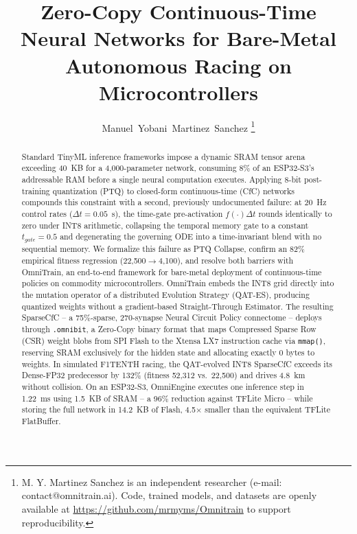 \documentclass[10pt,journal]{IEEEtran}
\begin{document}
\setlength{\textfloatsep}{4pt plus 1.0pt minus 2.0pt}
\setlength{\floatsep}{4pt plus 1.0pt minus 2.0pt}
\setlength{\intextsep}{4pt plus 1.0pt minus 2.0pt}
\setlength{\abovedisplayskip}{3pt}
\setlength{\belowdisplayskip}{3pt}

\title{Zero-Copy Continuous-Time Neural Networks for Bare-Metal Autonomous Racing on Microcontrollers}

\author{Manuel~Yobani~Martinez~Sanchez
\thanks{M. Y. Martinez Sanchez is an independent researcher (e-mail: contact@omnitrain.ai). Code, trained models, and datasets are openly available at \url{https://github.com/mrmyms/Omnitrain} to support reproducibility.}}


\maketitle

\begin{abstract}
Standard TinyML inference frameworks impose a dynamic SRAM tensor arena exceeding 40~KB for a 4,000-parameter network, consuming 8\% of an ESP32-S3's addressable RAM before a single neural computation executes. Applying 8-bit post-training quantization (PTQ) to closed-form continuous-time (CfC) networks compounds this constraint with a second, previously undocumented failure: at 20~Hz control rates ($\Delta t = 0.05$~s), the time-gate pre-activation $f(\cdot)\Delta t$ rounds identically to zero under INT8 arithmetic, collapsing the temporal memory gate to a constant $t_{gate}=0.5$ and degenerating the governing ODE into a time-invariant blend with no sequential memory. We formalize this failure as PTQ Collapse, confirm an 82\% empirical fitness regression (22,500$\to$4,100), and resolve both barriers with OmniTrain, an end-to-end framework for bare-metal deployment of continuous-time policies on commodity microcontrollers. OmniTrain embeds the INT8 grid directly into the mutation operator of a distributed Evolution Strategy (QAT-ES), producing quantized weights without a gradient-based Straight-Through Estimator. The resulting SparseCfC -- a 75\%-sparse, 270-synapse Neural Circuit Policy connectome -- deploys through \texttt{.omnibit}, a Zero-Copy binary format that maps Compressed Sparse Row (CSR) weight blobs from SPI Flash to the Xtensa LX7 instruction cache via \texttt{mmap()}, reserving SRAM exclusively for the hidden state and allocating exactly 0 bytes to weights. In simulated F1TENTH racing, the QAT-evolved INT8 SparseCfC exceeds its Dense-FP32 predecessor by 132\% (fitness 52,312 vs.\ 22,500) and drives 4.8~km without collision. On an ESP32-S3, OmniEngine executes one inference step in 1.22~ms using 1.5~KB of SRAM -- a 96\% reduction against TFLite Micro -- while storing the full network in 14.2~KB of Flash, 4.5$\times$ smaller than the equivalent TFLite FlatBuffer.
\end{abstract}
\end{document}
